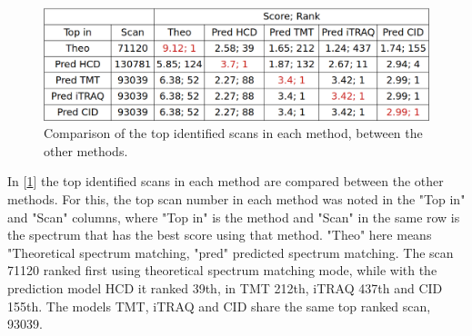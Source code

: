 \documentclass[11pt]{article}
\begin{document}
\begin{figure}[ht]
\centering
\includegraphics[width=1\textwidth]{figs/ident-comparison.png}
\caption{Comparison of the top identified scans in each method, between the other methods.}
\label{fig:ident-comparison}
\end{figure}

In [\cref{fig:ident-comparison}] the top identified scans in each method are compared between the other methods. For this, the top scan number in each method was noted in the "Top in" and "Scan" columns, where "Top in" is the method and "Scan" in the same row is the spectrum that has the best score using that method. "Theo" here means "Theoretical spectrum matching, "pred" predicted spectrum matching. 
The scan 71120 ranked first using theoretical spectrum matching mode, while with the prediction model HCD it ranked 39th, in TMT 212th, iTRAQ 437th and CID 155th. The models TMT, iTRAQ and CID share the same top ranked scan, 93039.
\end{document}
